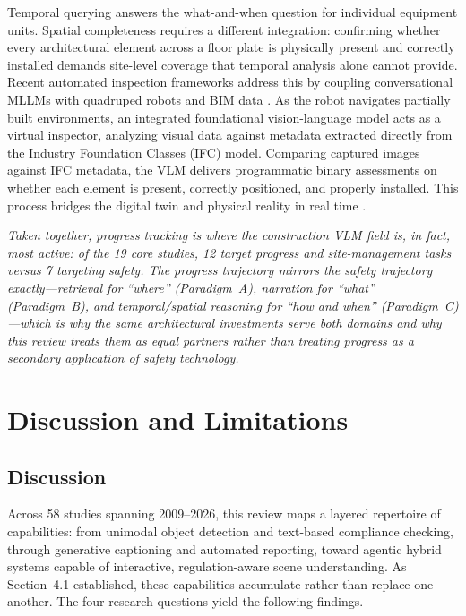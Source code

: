 \documentclass[10pt,letterpaper]{article}
\begin{document}
Temporal querying answers the what-and-when question for individual equipment units. Spatial completeness requires a different integration: confirming whether every architectural element across a floor plate is physically present and correctly installed demands site-level coverage that temporal analysis alone cannot provide. Recent automated inspection frameworks address this by coupling conversational MLLMs with quadruped robots and BIM data \cite{tuomisto2026}. As the robot navigates partially built environments, an integrated foundational vision-language model acts as a virtual inspector, analyzing visual data against metadata extracted directly from the Industry Foundation Classes (IFC) model. Comparing captured images against IFC metadata, the VLM delivers programmatic binary assessments on whether each element is present, correctly positioned, and properly installed. This process bridges the digital twin and physical reality in real time \cite{tuomisto2026}.

\textit{Taken together, progress tracking is where the construction VLM field is, in fact, most active: of the 19 core studies, 12 target progress and site-management tasks versus 7 targeting safety. The progress trajectory mirrors the safety trajectory exactly---retrieval for ``where'' (Paradigm~A), narration for ``what'' (Paradigm~B), and temporal/spatial reasoning for ``how and when'' (Paradigm~C)---which is why the same architectural investments serve both domains and why this review treats them as equal partners rather than treating progress as a secondary application of safety technology.}

\section{Discussion and Limitations}
\label{sec:discussion}

\subsection{Discussion}

Across 58 studies spanning 2009--2026, this review maps a layered repertoire of capabilities: from unimodal object detection and text-based compliance checking, through generative captioning and automated reporting, toward agentic hybrid systems capable of interactive, regulation-aware scene understanding. As Section~4.1 established, these capabilities accumulate rather than replace one another. The four research questions yield the following findings.
\end{document}
